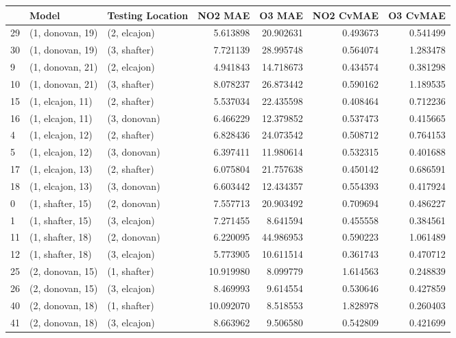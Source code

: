 \begin{tabular}{lllrrrr}
\toprule
{} &             Model & Testing Location &    NO2 MAE &     O3 MAE &  NO2 CvMAE &  O3 CvMAE \\
\midrule
29 &  (1, donovan, 19) &     (2, elcajon) &   5.613898 &  20.902631 &   0.493673 &  0.541499 \\
30 &  (1, donovan, 19) &     (3, shafter) &   7.721139 &  28.995748 &   0.564074 &  1.283478 \\
9  &  (1, donovan, 21) &     (2, elcajon) &   4.941843 &  14.718673 &   0.434574 &  0.381298 \\
10 &  (1, donovan, 21) &     (3, shafter) &   8.078237 &  26.873442 &   0.590162 &  1.189535 \\
15 &  (1, elcajon, 11) &     (2, shafter) &   5.537034 &  22.435598 &   0.408464 &  0.712236 \\
16 &  (1, elcajon, 11) &     (3, donovan) &   6.466229 &  12.379852 &   0.537473 &  0.415665 \\
4  &  (1, elcajon, 12) &     (2, shafter) &   6.828436 &  24.073542 &   0.508712 &  0.764153 \\
5  &  (1, elcajon, 12) &     (3, donovan) &   6.397411 &  11.980614 &   0.532315 &  0.401688 \\
17 &  (1, elcajon, 13) &     (2, shafter) &   6.075804 &  21.757638 &   0.450142 &  0.686591 \\
18 &  (1, elcajon, 13) &     (3, donovan) &   6.603442 &  12.434357 &   0.554393 &  0.417924 \\
0  &  (1, shafter, 15) &     (2, donovan) &   7.557713 &  20.903492 &   0.709694 &  0.486227 \\
1  &  (1, shafter, 15) &     (3, elcajon) &   7.271455 &   8.641594 &   0.455558 &  0.384561 \\
11 &  (1, shafter, 18) &     (2, donovan) &   6.220095 &  44.986953 &   0.590223 &  1.061489 \\
12 &  (1, shafter, 18) &     (3, elcajon) &   5.773905 &  10.611514 &   0.361743 &  0.470712 \\
25 &  (2, donovan, 15) &     (1, shafter) &  10.919980 &   8.099779 &   1.614563 &  0.248839 \\
26 &  (2, donovan, 15) &     (3, elcajon) &   8.469993 &   9.614554 &   0.530646 &  0.427859 \\
40 &  (2, donovan, 18) &     (1, shafter) &  10.092070 &   8.518553 &   1.828978 &  0.260403 \\
41 &  (2, donovan, 18) &     (3, elcajon) &   8.663962 &   9.506580 &   0.542809 &  0.421699 \\

\end{tabular}

